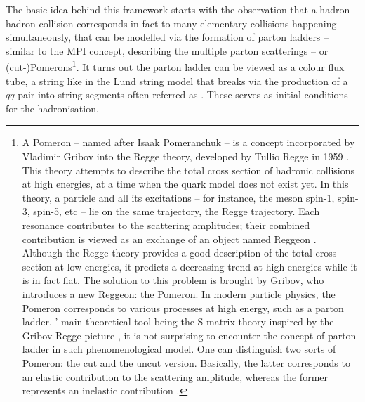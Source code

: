 The basic idea behind this framework starts with the observation that a hadron-hadron collision corresponds in fact to many elementary collisions happening simultaneously, that can be modelled via the formation of parton ladders -- similar to the MPI concept, describing the multiple parton scatterings -- or (cut-)Pomerons\footnote{A Pomeron -- named after Isaak Pomeranchuk -- is a concept incorporated by Vladimir Gribov into the Regge theory, developed by Tullio Regge in 1959 \cite{reggeIntroductionComplexOrbital1959}. This theory attempts to describe the total cross section of hadronic collisions at high energies, at a time when the quark model does not exist yet. In this theory, a particle and all its excitations -- for instance, the \rhoMes meson spin-1, spin-3, spin-5, etc -- lie on the same trajectory, the Regge trajectory. Each resonance contributes to the scattering amplitudes; their combined contribution is viewed as an exchange of an object named Reggeon \cite{levinEverythingReggeonsPart1998}. Although the Regge theory provides a good description of the total cross section at low energies, it predicts a decreasing trend at high energies while it is in fact flat. The solution to this problem is brought by Gribov, who introduces a new Reggeon: the Pomeron. In modern particle physics, the Pomeron corresponds to various processes at high energy, such as a parton ladder. \Epos' main theoretical tool being the S-matrix theory inspired by the Gribov-Regge picture \cite{wernerCorecoronaProcedureMicrocanonical2023}, it is not surprising to encounter the concept of parton ladder in such phenomenological model. One can distinguish two sorts of Pomeron: the cut and the uncut version. Basically, the latter corresponds to an elastic contribution to the scattering amplitude, whereas the former represents an inelastic contribution \cite{wernerMonteCarloEvent2022}.}. It turns out the parton ladder can be viewed as a colour flux tube, a string like in the Lund string model that breaks via the production of a $q\bar{q}$ pair into string segments often referred as . These serves as initial conditions for the hadronisation.

